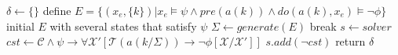 \documentclass[8pt,twocolumn]{ctexart}
\begin{document}
\begin{algorithm}
    \caption{$SynthesisStrategy(\Psi)$}
    \LinesNumbered
    
    $\delta\gets\{\}$\;
     {
         {
            define $E=\{(x_e,\{k\})|x_e\vDash\psi\land pre(a(k))\land do(a(k),x_e)\vDash\neg\phi\}$\;
            initial $E$ with several states that satisfy $\psi$\;
             {
                $\Sigma\gets generate(E)$\;
                 {
                    break\;
                }
                $s\gets solver$\;
                $cst\gets\mathcal{C}\land\psi\rightarrow\forall\mathcal{X}'[\mathcal{T}(a(k/\Sigma))\rightarrow\lnot\phi[\mathcal{X}/\mathcal{X}']]$\;
                $s.add(\neg cst)$\;
            }
        }
    }
    return $\delta$\;
    
\end{algorithm}
\end{document}
